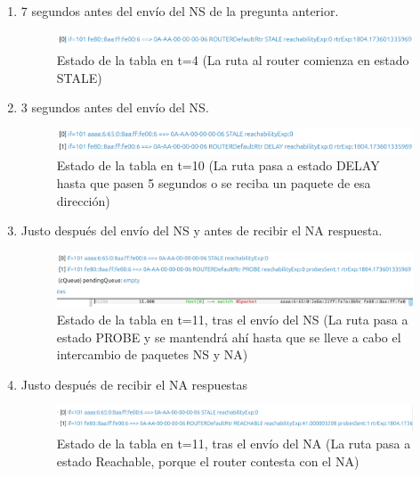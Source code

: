 \begin{enumerate}
    \item 7 segundos antes del envío del NS de la pregunta anterior.
    \begin{figure}[H]
        \centering
        \includegraphics[width=135mm, scale=0.75]{imaxes/ejercicio4_5_1.png}
        \caption{Estado de la tabla en t=4 (La ruta al router comienza en estado STALE)}
        \label{fig:51}
    \end{figure}
    \item 3 segundos antes del envío del NS.
    \begin{figure}[H]
        \centering
        \includegraphics[width=135mm, scale=0.75]{imaxes/ejercicio4_5_2.png}
        \caption{Estado de la tabla en t=10 (La ruta pasa a estado DELAY hasta que pasen 5 segundos o se reciba un paquete de esa dirección)}
        \label{fig:52}
    \end{figure}
    \item Justo después del envío del NS y antes de recibir el NA respuesta.
    \begin{figure}[H]
        \centering
        \includegraphics[width=135mm, scale=0.75]{imaxes/ejercicio4_5_3.png}
        \caption{Estado de la tabla en t=11, tras el envío del NS (La ruta pasa a estado PROBE y se mantendrá ahí hasta que se lleve a cabo el intercambio de paquetes NS y NA)}
        \label{fig:53}
    \end{figure}
    \item Justo después de recibir el NA respuestas
    \begin{figure}[H]
        \centering
        \includegraphics[width=135mm, scale=0.75]{imaxes/ejercicio4_5_4.png}
        \caption{Estado de la tabla en t=11, tras el envío del NA (La ruta pasa a estado Reachable, porque el router contesta con el NA)}
        \label{fig:54}
    \end{figure}
\end{enumerate}
